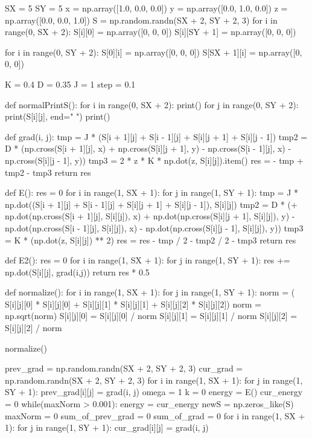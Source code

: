 \documentclass[ 12pt,x11names]{article}
\begin{document}
 \begin{python}

SX = 5
SY = 5
x = np.array([1.0, 0.0, 0.0])
y = np.array([0.0, 1.0, 0.0])
z = np.array([0.0, 0.0, 1.0])
S = np.random.randn(SX + 2, SY + 2, 3)
for i in range(0, SX + 2):
    S[i][0] = np.array([0, 0, 0])
    S[i][SY + 1] = np.array([0, 0, 0])

for i in range(0, SY + 2):
    S[0][i] = np.array([0, 0, 0])
    S[SX + 1][i] = np.array([0, 0, 0])

K = 0.4
D = 0.35
J = 1
step = 0.1

def normalPrintS():
    for i in range(0, SX + 2):
        print()
        for j in range(0, SY + 2):
            print(S[i][j], end=" ")
    print()


def grad(i, j):
    tmp = J * (S[i + 1][j] + S[i - 1][j]
             + S[i][j + 1] + S[i][j - 1])
    tmp2 = D * (np.cross(S[i + 1][j], x)
              + np.cross(S[i][j + 1], y)
              - np.cross(S[i - 1][j], x)
              - np.cross(S[i][j - 1], y))
    tmp3 = 2 * z * K * np.dot(z, S[i][j]).item()
    res = - tmp + tmp2 - tmp3
    return res


def E():
    res = 0
    for i in range(1, SX + 1):
        for j in range(1, SY + 1):
            tmp = J * np.dot((S[i + 1][j] + S[i - 1][j]
                            + S[i][j + 1] + S[i][j - 1]), S[i][j])
            tmp2 = D * (+ np.dot(np.cross(S[i + 1][j], S[i][j]), x)
                        + np.dot(np.cross(S[i][j + 1], S[i][j]), y)
                        - np.dot(np.cross(S[i - 1][j], S[i][j]), x)
                        - np.dot(np.cross(S[i][j - 1], S[i][j]), y))
            tmp3 = K * (np.dot(z, S[i][j]) ** 2)
            res = res - tmp / 2 - tmp2 / 2 - tmp3
    return res

def E2():
    res = 0
    for i in range(1, SX + 1):
        for j in range(1, SY + 1):
            res += np.dot(S[i][j], grad(i,j))
    return res * 0.5

def normalize():
    for i in range(1, SX + 1):
        for j in range(1, SY + 1):
            norm = (
            S[i][j][0] * S[i][j][0] +
            S[i][j][1] * S[i][j][1] +
            S[i][j][2] * S[i][j][2])
            norm = np.sqrt(norm)
            S[i][j][0] = S[i][j][0] / norm
            S[i][j][1] = S[i][j][1] / norm
            S[i][j][2] = S[i][j][2] / norm

normalize()

prev_grad =  np.random.randn(SX + 2, SY + 2, 3)
cur_grad = np.random.randn(SX + 2, SY + 2, 3)
for i in range(1, SX + 1):
    for j in range(1, SY + 1):
        prev_grad[i][j] = grad(i, j)
omega = 1
k = 0
energy  = E()
cur_energy = 0
while(maxNorm > 0.001):
    energy =  cur_energy
    newS = np.zeros_like(S)
    maxNorm = 0
    sum_of_prev_grad = 0
    sum_of_grad  =  0
    for i in range(1, SX + 1):
        for j in range(1, SY + 1):
            cur_grad[i][j] = grad(i,  j)


\end{python}
\end{document}
